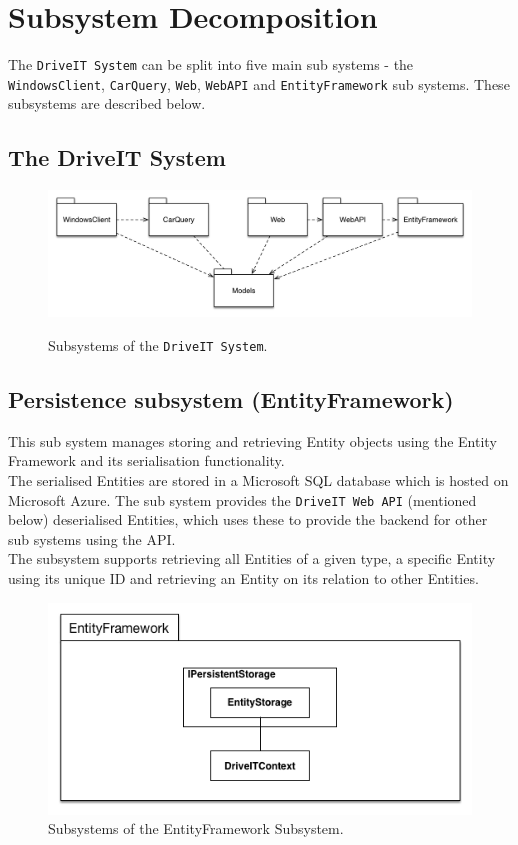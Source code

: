 \section{Subsystem Decomposition}
The \texttt{DriveIT System} can be split into five main sub systems - the \texttt{WindowsClient}, \texttt{CarQuery}, \texttt{Web}, \texttt{WebAPI} and \texttt{EntityFramework} sub systems. 
These subsystems are described below. 

\subsection{The DriveIT System}
\begin{figure}[H]
	\centering
	\includegraphics[width=\textwidth]{Figures/DriveITSubsystemDecomposition}\\
	\caption{Subsystems of the \texttt{DriveIT System}.}
\end{figure}

\subsection{Persistence subsystem (EntityFramework)} 
This sub system manages storing and retrieving Entity objects using the Entity Framework and its serialisation functionality.\\
The serialised Entities are stored in a Microsoft SQL database which is hosted on Microsoft Azure. The sub system provides the \texttt{DriveIT Web API} (mentioned below) deserialised Entities, which uses these to provide the backend for other sub systems using the API.\\
The subsystem supports retrieving all Entities of a given type, a specific Entity using its unique ID and retrieving an Entity on its relation to other Entities. 
\begin{figure}[H]
	\centering
	\includegraphics[width=\textwidth]{Figures/EntityFrameworkSubsystemDecomposition}
	\caption{Subsystems of the EntityFramework Subsystem.}
\end{figure}


